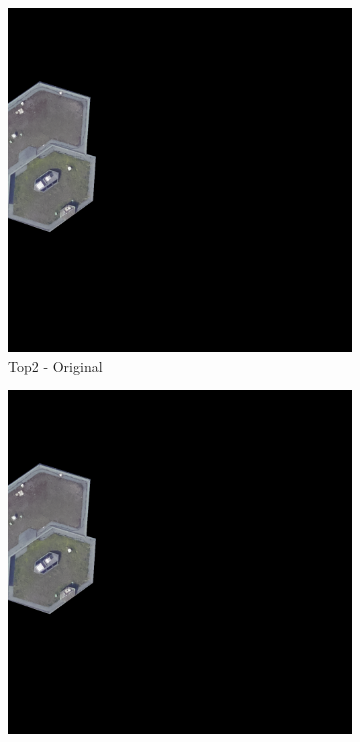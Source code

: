 \begin{figure}[H]
\begin{subfigure}{0.32\textwidth}
    \includegraphics[width=\textwidth]{02-main//figures/ch4/kfold_ensembles/segformer_tu-regnety_080.ra3_in1k/worst_cases/worst_4_iou0.000_25001117_tile_3_9_5ba8f7_original.png}
    \caption{Top2 - Original}
\end{subfigure}
\hfill
\begin{subfigure}{0.32\textwidth}
    \includegraphics[width=\textwidth]{02-main//figures/ch4/kfold_ensembles/segformer_tu-regnety_080.ra3_in1k/worst_cases/worst_4_iou0.000_25001117_tile_3_9_5ba8f7_overlay_gt.png}

\end{subfigure}
\end{figure}

